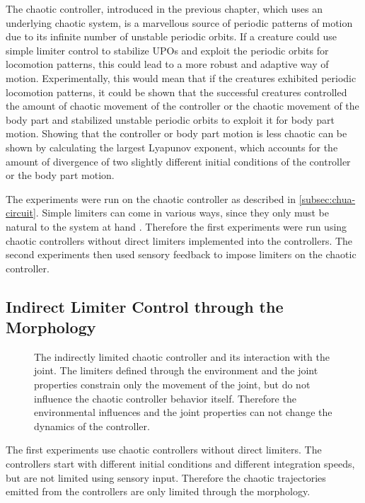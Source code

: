 \documentclass[main]{subfiles}
\begin{document}
The chaotic controller, introduced in the previous chapter, which uses an underlying chaotic system, is a marvellous source of periodic patterns of motion due to its infinite number of unstable periodic orbits. %
%
If a creature could use simple limiter control to stabilize UPOs and exploit the periodic orbits for locomotion patterns, this could lead to a more robust and adaptive way of motion. %
%
Experimentally, this would mean that if the creatures exhibited periodic locomotion patterns, it could be shown that the successful creatures controlled the amount of chaotic movement of the controller or the chaotic movement of the body part and stabilized unstable periodic orbits to exploit it for body part motion. %
%
Showing that the controller or body part motion is less chaotic can be shown by calculating the largest Lyapunov exponent, which accounts for the amount of divergence of two slightly different initial conditions of the controller or the body part motion.

The experiments were run on the chaotic controller as described in \ref{subsec:chua-circuit}. %
%
Simple limiters can come in various ways, since they only must be natural to the system at hand \cite{bib:Corron2000}. %
%
Therefore the first experiments were run using chaotic controllers without direct limiters implemented into the controllers. %
%
The second experiments then used sensory feedback to impose limiters on the chaotic controller. 

\subsection{Indirect Limiter Control through the Morphology}

\begin{figure}[H]


\caption[The indirectly limited chaotic controller and joint complex]{The indirectly limited chaotic controller and its interaction with the joint. The limiters defined through the environment and the joint properties constrain only the movement of the joint, but do not influence the chaotic controller behavior itself. Therefore the environmental influences and the joint properties can not change the dynamics of the controller.}
\label{figure:indirect-limit-controller-joint-complex}
\end{figure}

The first experiments use chaotic controllers without direct limiters. %
%
The controllers start with different initial conditions and different integration speeds, but are not limited using sensory input. %
%
Therefore the chaotic trajectories emitted from the controllers are only limited through the morphology. %
%
\end{document}

